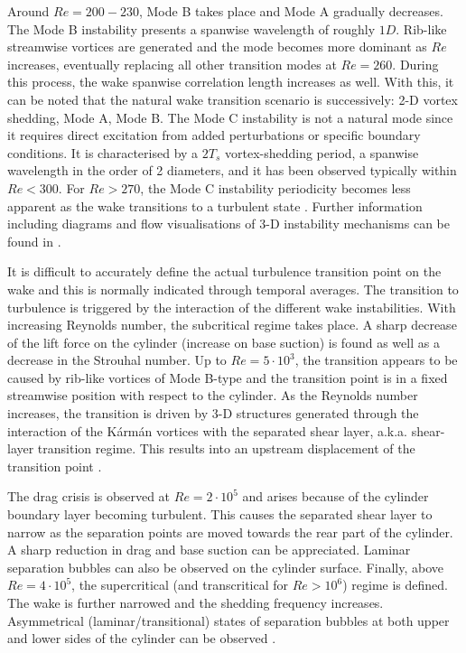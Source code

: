 \documentclass[../main.tex]{subfiles}
\begin{document}
Around $Re=200-230$, Mode B takes place and Mode A gradually decreases.
The Mode B instability presents a spanwise wavelength of roughly $1D$.
Rib-like streamwise vortices are generated and the mode becomes more dominant as $Re$ increases, eventually replacing all other transition modes at $Re=260$.
During this process, the wake spanwise correlation length increases as well.
With this, it can be noted that the natural wake transition scenario is successively: 2-D vortex shedding, Mode A, Mode B.
The Mode C instability is not a natural mode since it requires direct excitation from added perturbations or specific boundary conditions.
It is characterised by a $2T_s$ vortex-shedding period, a spanwise wavelength in the order of 2 diameters, and it has been observed typically within $Re<300$.
For $Re>270$, the Mode C instability periodicity becomes less apparent as the wake transitions to a turbulent state \citep{Jiang2020}.
Further information including diagrams and flow visualisations of 3-D instability mechanisms can be found in \cite{Williamson1996b, Williamson1996a}.

It is difficult to accurately define the actual turbulence transition point on the wake and this is normally indicated through temporal averages.
The transition to turbulence is triggered by the interaction of the different wake instabilities.
With increasing Reynolds number, the subcritical regime takes place.
A sharp decrease of the lift force on the cylinder (increase on base suction) is found as well as a decrease in the Strouhal number.
Up to $Re=5\cdot 10^3$, the transition appears to be caused by rib-like vortices of Mode B-type and the transition point is in a fixed streamwise position with respect to the cylinder.
As the Reynolds number increases, the transition is driven by 3-D structures generated through the interaction of the K\'{a}rm\'{a}n vortices with the separated shear layer, a.k.a. shear-layer transition regime.
This results into an upstream displacement of the transition point \citep{Bloor1964,Williamson1996a,Norberg2001}.

The drag crisis is observed at $Re=2\cdot 10^5$ and arises because of the cylinder boundary layer becoming turbulent.
This causes the separated shear layer to narrow as the separation points are moved towards the rear part of the cylinder.
A sharp reduction in drag and base suction can be appreciated.
Laminar separation bubbles can also be observed on the cylinder surface.
Finally, above $Re=4\cdot 10^5$, the supercritical (and transcritical for $Re>10^6$) regime is defined.
The wake is further narrowed and the shedding frequency increases.
Asymmetrical (laminar/transitional) states of separation bubbles at both upper and lower sides of the cylinder can be observed \citep{Noack1999b}.
\end{document}

